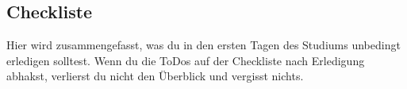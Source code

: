
\subsection{Checkliste}
\label{checkliste}
	Hier wird zusammengefasst, was du in den ersten Tagen des Studiums unbedingt erledigen solltest. Wenn du die ToDos auf der Checkliste nach Erledigung abhakst, verlierst du nicht den Überblick und vergisst nichts.
	
\vspace*{0.5cm}

